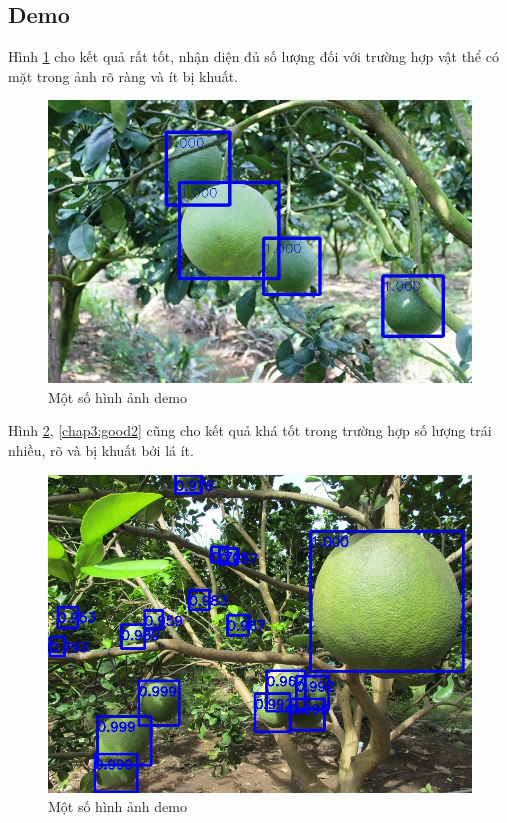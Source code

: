 \subsection{Demo}
Hình \ref{chap3:good} cho kết quả rất tốt, nhận diện đủ số lượng đối với trường hợp vật thể có mặt trong ảnh rõ ràng và ít bị khuất.
\begin{center}
    \begin{figure}[H]
    \centering
    \includegraphics[width=0.6\columnwidth]{images/chap3/demo_001.jpg}
    \caption{Một số hình ảnh demo}
    \label{chap3:good}
    \end{figure}
\end{center}

Hình \ref{chap3:good1}, \ref{chap3:good2} cũng cho kết quả khá tốt trong trường hợp số lượng trái nhiều, rõ và bị khuất bởi lá ít. 
\begin{center}
    \begin{figure}[H]
    \centering
    \includegraphics[width=0.6\columnwidth]{images/chap3/demo_002.jpg}
    \caption{Một số hình ảnh demo}
    \label{chap3:good1}
    \end{figure}
\end{center}

